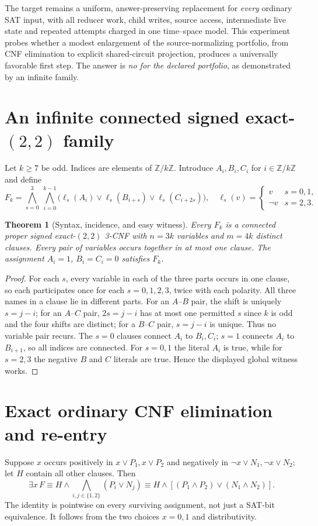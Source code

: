 \documentclass[11pt]{article}
\newtheorem{theorem}{Theorem}
\begin{document}
The target remains a uniform, answer-preserving replacement for \emph{every}
ordinary SAT input, with all reducer work, child writes, source access,
intermediate live state and repeated attempts charged in one time--space model.
This experiment probes whether a modest enlargement of the source-normalizing
portfolio, from CNF elimination to explicit shared-circuit projection, produces
a universally favorable first step. The answer is \emph{no for the declared
portfolio}, as demonstrated by an infinite family.

\section{An infinite connected signed exact-$(2,2)$ family}
Let $k\ge7$ be odd. Indices are elements of $\mathbb Z/k\mathbb Z$.
Introduce $A_i,B_i,C_i$ for $i\in\mathbb Z/k\mathbb Z$ and define
\[
F_k=\bigwedge_{s=0}^3\ \bigwedge_{i=0}^{k-1}
 \bigl(\ell_s(A_i)\lor\ell_s(B_{i+s})\lor\ell_s(C_{i+2s})\bigr),
\quad
\ell_s(v)=\begin{cases}v&s=0,1,\\ \neg v&s=2,3.\end{cases}
\]

\begin{theorem}[Syntax, incidence, and easy witness]
Every $F_k$ is a connected proper signed exact-$(2,2)$ 3-CNF with $n=3k$
variables and $m=4k$ distinct clauses. Every pair of variables occurs together
in at most one clause. The assignment $A_i=1$, $B_i=C_i=0$ satisfies $F_k$.
\end{theorem}
\begin{proof}
For each $s$, every variable in each of the three parts occurs in one
clause, so each participates once for each $s=0,1,2,3$, twice with each
polarity. All three names in a clause lie in different parts. For an
$A$--$B$ pair, the shift is uniquely $s=j-i$; for an $A$--$C$ pair,
$2s=j-i$ has at most one permitted $s$ since $k$ is odd and the four
shifts are distinct; for a $B$--$C$ pair, $s=j-i$ is unique. Thus no
variable pair recurs. The $s=0$ clauses connect $A_i$ to $B_i,C_i$;
$s=1$ connects $A_i$ to $B_{i+1}$, so all indices are connected.
For $s=0,1$ the literal $A_i$ is true, while for $s=2,3$ the negative
$B$ and $C$ literals are true. Hence the displayed global witness works.
\end{proof}

\section{Exact ordinary CNF elimination and re-entry}
Suppose $x$ occurs positively in $x\lor P_1,x\lor P_2$ and negatively
in $\neg x\lor N_1,\neg x\lor N_2$; let $H$ contain all other clauses.
Then
\begin{equation}\label{eq:dp}
\exists x\,F
\equiv H\land\bigwedge_{i,j\in\{1,2\}}(P_i\lor N_j)
\equiv H\land\left[(P_1\land P_2)\lor(N_1\land N_2)\right].
\end{equation}
The identity is pointwise on every surviving assignment, not just a SAT-bit
equivalence. It follows from the two choices $x=0,1$ and distributivity.
\end{document}
